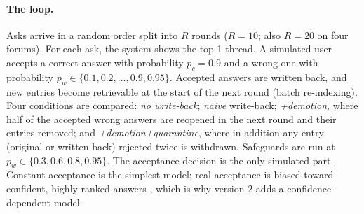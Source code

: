 \documentclass[11pt]{article}
\begin{document}
\paragraph{The loop.} Asks arrive in a random order split into $R$ rounds ($R=10$; also $R=20$ on four forums). For each ask, the system shows the top-1 thread. A simulated user accepts a correct answer with probability $p_c=0.9$ and a wrong one with probability $p_w\in\{0.1,0.2,\dots,0.9,0.95\}$. Accepted answers are written back, and new entries become retrievable at the start of the next round (batch re-indexing). Four conditions are compared: \emph{no write-back}; \emph{naive} write-back; \emph{+demotion}, where half of the accepted wrong answers are reopened in the next round and their entries removed; and \emph{+demotion+quarantine}, where in addition any entry (original or written back) rejected twice is withdrawn. Safeguards are run at $p_w\in\{0.3,0.6,0.8,0.95\}$. The acceptance decision is the only simulated part. Constant acceptance is the simplest model; real acceptance is biased toward confident, highly ranked answers \citep{joachims2005accurately,joachims2007evaluating}, which is why version 2 adds a confidence-dependent model.
\end{document}
